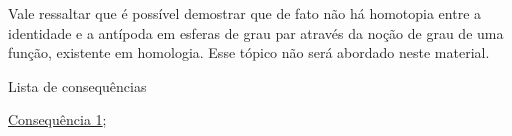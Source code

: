 Vale ressaltar que é possível demostrar que de fato não há homotopia entre a identidade e a antípoda em esferas de grau par através da noção de grau de uma função, existente em homologia. Esse tópico não será abordado neste material.

\begin{titlemize}{Lista de consequências}
	\item \hyperref[consequencia1]{Consequência 1};\\ %
\end{titlemize}

